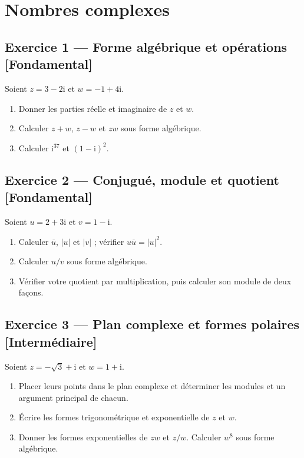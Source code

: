 \documentclass[11pt,a4paper,oneside]{article}
\newcommand{\exo}[3]{%
  \Needspace{6\baselineskip}%
  \subsection*{Exercice #1 --- #3 \hfill
  {\normalfont\footnotesize\color{GrisTexte}[#2]}}}
\newcommand{\ii}{\mathrm i}
\begin{document}
\section{Nombres complexes}
\exo{1}{Fondamental}{Forme algébrique et opérations}
Soient $z=3-2\ii$ et $w=-1+4\ii$.
\begin{enumerate}[label=\alph*)]
\item Donner les parties réelle et imaginaire de $z$ et $w$.
\item Calculer $z+w$, $z-w$ et $zw$ sous forme algébrique.
\item Calculer $\ii^{37}$ et $(1-\ii)^2$.
\end{enumerate}
\exo{2}{Fondamental}{Conjugué, module et quotient}
Soient $u=2+3\ii$ et $v=1-\ii$.
\begin{enumerate}[label=\alph*)]
\item Calculer $\overline u$, $|u|$ et $|v|$ ; vérifier $u\overline u=|u|^2$.
\item Calculer $u/v$ sous forme algébrique.
\item Vérifier votre quotient par multiplication, puis calculer son module de deux façons.
\end{enumerate}
\exo{3}{Intermédiaire}{Plan complexe et formes polaires}
Soient $z=-\sqrt3+\ii$ et $w=1+\ii$.
\begin{enumerate}[label=\alph*)]
\item Placer leurs points dans le plan complexe et déterminer les modules et un argument principal de chacun.
\item Écrire les formes trigonométrique et exponentielle de $z$ et $w$.
\item Donner les formes exponentielles de $zw$ et $z/w$. Calculer $w^8$ sous forme algébrique.
\end{enumerate}
\end{document}
